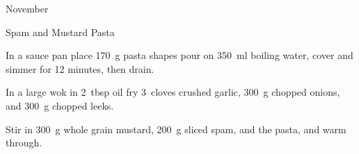 \begin{menu}{November}
\begin{recipe}{1}{Spam and Mustard Pasta}
	
    \begin{instructions}
    \item 
    In a
    sauce pan
    place
    170~g  pasta shapes
    pour on
    350~ml  boiling water,
    cover and simmer for 12 minutes, then drain.
  \item 
        In a large wok in
        2~tbsp  oil
        fry
        3~cloves crushed garlic,
        300~g chopped onions,
        and
        300~g chopped leeks.
      \item 
        Stir in
        300~g  whole grain mustard,
        200~g sliced spam,
        and the pasta,
        and warm through.
      
    \end{instructions}
    \end{recipe}%
  
    \clearpage
    \end{menu}
	
